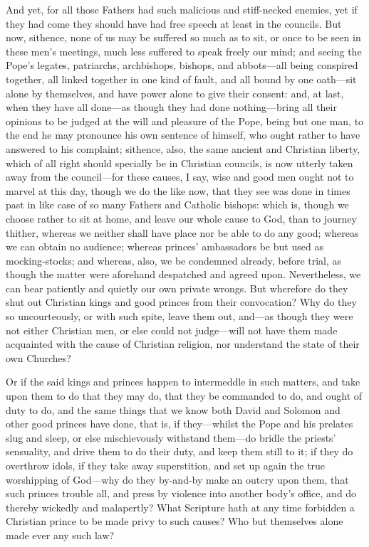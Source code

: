 And yet, for all those Fathers had such malicious and stiff-necked
enemies, yet if they had come they should have had free speech at least
in the councils. But now, sithence, none of us may be suffered
so much as to sit, or once to be seen in these men’s meetings,
much less suffered to speak freely our mind; and seeing the Pope’s
legates, patriarchs, archbishops, bishops, and abbots—all being
conspired
together, all linked together in one kind of fault, and all bound by
one oath—sit alone by themselves, and have power alone to give
their consent: and, at last, when they have all done—as though
they had done nothing—bring all their opinions to be judged at
the will and pleasure of the Pope, being but one man, to the end he
may pronounce his own sentence of himself, who ought rather to have
answered to his complaint; sithence, also, the same ancient and Christian
liberty, which of all right should specially be in Christian councils,
is now utterly taken away from the council—for these causes, I
say, wise and good men ought not to marvel at this day, though we do
the like now, that they see was done in times past in like case of so
many Fathers and Catholic bishops: which is, though we choose rather
to sit at home, and leave our whole cause to God, than to journey thither,
whereas we neither shall have place nor be able to do any good; whereas
we can obtain no audience; whereas princes’ ambassadors be but
used as mocking-stocks; and whereas, also, we be condemned already,
before trial, as though the matter were aforehand despatched and agreed
upon. Nevertheless, we can bear patiently and quietly our
own private wrongs. But wherefore do they shut out Christian kings
and good princes from their convocation? Why do they so uncourteously,
or with such spite, leave them out, and—as though they were not
either Christian men, or else could not judge—will not have them
made acquainted with the cause of Christian religion, nor understand
the state of their own Churches?

Or if the said kings and princes happen to intermeddle in such matters,
and take upon them to do that they may do, that they be commanded to
do, and ought of duty to do, and the same things that we know both David
and Solomon and other good princes have done, that is, if they—whilst
the Pope and his prelates slug and sleep, or else mischievously withstand
them—do bridle the priests’ sensuality, and drive them to
do their duty, and keep them still to it; if they do overthrow idols,
if they take away superstition, and set up again the true worshipping
of God—why do they by-and-by make an outcry upon them, that such
princes trouble all, and press by violence into another body’s
office, and do thereby wickedly and malapertly? What Scripture
hath at any time forbidden a Christian prince to be made privy to such
causes? Who but themselves alone made ever any such law?

